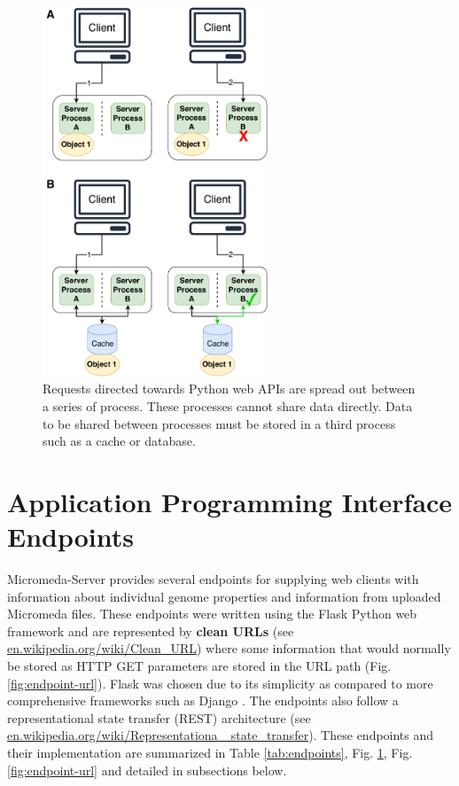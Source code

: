 \begin{figure}[!ht]
  \centering
	\includegraphics[width=0.60\textwidth]{media/Client-Processing.pdf}
	 \caption{Requests directed towards Python web APIs are spread out between a series of process. These processes cannot share data directly. Data to be shared between processes must be stored in a third process such as a cache or database.}
	 \label{fig:client-processing}
\end{figure}

\section{Application Programming Interface Endpoints} \label{endpoints}

Micromeda-Server provides several endpoints for supplying web clients with information about individual genome properties and information from uploaded Micromeda files. These endpoints were written using the Flask Python web framework \cite{grinberg2018flask} and are represented by \textbf{clean URLs} (see \href{en.wikipedia.org/wiki/Clean\_URL}{en.wikipedia.org/wiki/Clean\_URL}) where some information that would normally be stored as HTTP GET parameters are stored in the URL path (Fig. \ref{fig:endpoint-url}). Flask was chosen due to its simplicity as compared to more comprehensive frameworks such as Django \cite{holovaty2009definitive}. The endpoints also follow a representational state transfer (REST) architecture \cite{fielding2000representational} (see \href{en.wikipedia.org/wiki/Representational\_state\_transfer}{en.wikipedia.org/wiki/Representationa \_state\_transfer}). These endpoints and their implementation are summarized in Table \ref{tab:endpoints}, Fig. \ref{endpoints}, Fig. \ref{fig:endpoint-url} and detailed in subsections below.

